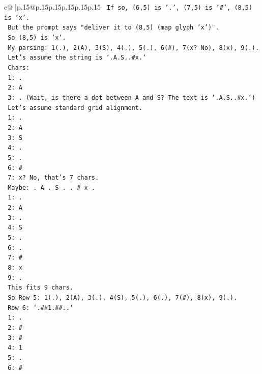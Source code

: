 \documentclass{article}
\begin{document}
{\begin{supertabular}{c@{$\;$}|p{.15\linewidth}@{}p{.15\linewidth}p{.15\linewidth}p{.15\linewidth}p{.15\linewidth}p{.15\linewidth}}
{{{\texttt{   If so, (6,5) is '.', (7,5) is '\#', (8,5) is 'x'.} \\
\texttt{   But the prompt says "deliver it to (8,5) (map glyph 'x')".} \\
\texttt{   So (8,5) is 'x'.} \\
\texttt{   My parsing: 1(.), 2(A), 3(S), 4(.), 5(.), 6(\#), 7(x? No), 8(x), 9(.).} \\
\texttt{   Let's assume the string is `.A.S..\#x.`} \\
\texttt{   Chars:} \\
\texttt{   1: .} \\
\texttt{   2: A} \\
\texttt{   3: . (Wait, is there a dot between A and S? The text is `.A.S..\#x.`)} \\
\texttt{   Let's assume standard grid alignment.} \\
\texttt{   1: .} \\
\texttt{   2: A} \\
\texttt{   3: S} \\
\texttt{   4: .} \\
\texttt{   5: .} \\
\texttt{   6: \#} \\
\texttt{   7: x? No, that's 7 chars.} \\
\texttt{   Maybe: . A . S . . \# x .} \\
\texttt{   1: .} \\
\texttt{   2: A} \\
\texttt{   3: .} \\
\texttt{   4: S} \\
\texttt{   5: .} \\
\texttt{   6: .} \\
\texttt{   7: \#} \\
\texttt{   8: x} \\
\texttt{   9: .} \\
\texttt{   This fits 9 chars.} \\
\texttt{   So Row 5: 1(.), 2(A), 3(.), 4(S), 5(.), 6(.), 7(\#), 8(x), 9(.).} \\
\texttt{   Row 6: `.\#\#1.\#\#..`} \\
\texttt{   1: .} \\
\texttt{   2: \#} \\
\texttt{   3: \#} \\
\texttt{   4: 1} \\
\texttt{   5: .} \\
\texttt{   6: \#} \\
}}}
\end{supertabular}}
\end{document}
